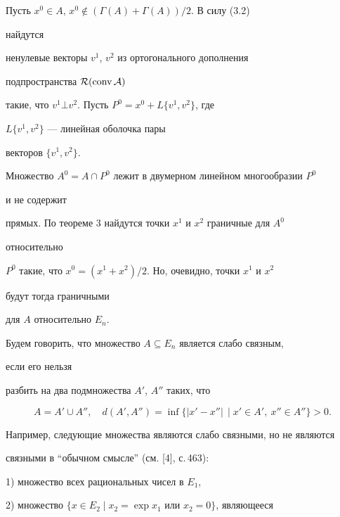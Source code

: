  


\begin{pf} 


Пусть $x^0\in A$, $x^0\notin(\Gamma(A)+\Gamma(A))/2$. В силу (3.2) 


найдутся 


ненулевые векторы $v^1$, $v^2$ из ортогонального дополнения 


подпространства $\cal R(\operatorname{conv} A)$ 


такие, что $v^1\bot v^2$. Пусть $P^0=x^0+L\{v^1,v^2\}$, где 


$L\{v^1,v^2\}$ --- линейная оболочка пары 


векторов $\{v^1,v^2\}$. 


 


Множество $A^0=A\cap P^0$ лежит в двумерном линейном многообразии $P^0$ 


и не содержит 


прямых. По теореме 3 найдутся точки $x^1$ и $x^2$ граничные для $A^0$ 


относительно 


$P^0$ такие, что $x^0=(x^1+x^2)/2$. Но, очевидно, точки $x^1$ и $x^2$ 


будут тогда граничными 


для $A$ относительно $E_n$. 


\end{pf} 


 


Будем говорить, что множество $A\subseteq E_n$ является слабо связным, 


если его нельзя 


разбить на два подмножества $A'$, $A''$ таких, что 


$$ 


A=A'\cup A'',\quad 


d(A',A'')=\inf\{|x'-x''|\,\mid x'\in A',\ x''\in A''\}>0. 


$$ 


Например, следующие множества являются слабо связными, но не являются 


связными в ``обычном смысле'' (см. [4], с.\,463):


 


1) множество всех рациональных чисел в $E_1$, 


 


2) множество $\{x\in E_2\mid x_2=\exp x_1$ или $x_2=0\}$, являющееся 


